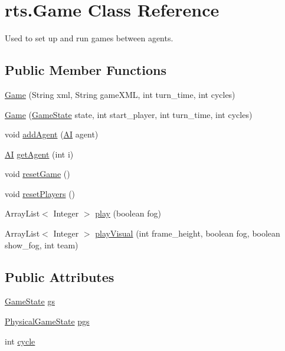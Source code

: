 \hypertarget{classrts_1_1_game}{
\section{rts.Game Class Reference}
\label{classrts_1_1_game}
}


Used to set up and run games between agents.  


\subsection*{Public Member Functions}
\begin{DoxyCompactItemize}
\item 
\hyperlink{classrts_1_1_game_a8be31ab56d3667a5de133f49d0c00873}{Game} (String xml, String gameXML, int turn\_\-time, int cycles)
\item 
\hyperlink{classrts_1_1_game_af219d17cd23b1ab5d518093eb3485b5b}{Game} (\hyperlink{classrts_1_1_game_state}{GameState} state, int start\_\-player, int turn\_\-time, int cycles)
\item 
void \hyperlink{classrts_1_1_game_aa8d2808f44534b0824965aad4d45d6b5}{addAgent} (\hyperlink{classai_1_1_a_i}{AI} agent)
\item 
\hyperlink{classai_1_1_a_i}{AI} \hyperlink{classrts_1_1_game_a73ddc70ae77467fa3e9a5abf86d692b5}{getAgent} (int i)
\item 
void \hyperlink{classrts_1_1_game_a53e09d1e869efe1c3c9faec51ca17607}{resetGame} ()
\item 
void \hyperlink{classrts_1_1_game_a787a8c636b903e86ae019db6475c7435}{resetPlayers} ()
\item 
ArrayList$<$ Integer $>$ \hyperlink{classrts_1_1_game_a2e4d31e7df06309c185d7fd6a613424a}{play} (boolean fog)
\item 
ArrayList$<$ Integer $>$ \hyperlink{classrts_1_1_game_a74d737f4b4312dc155350f624ee3a5c0}{playVisual} (int frame\_\-height, boolean fog, boolean show\_\-fog, int team)
\end{DoxyCompactItemize}
\subsection*{Public Attributes}
\begin{DoxyCompactItemize}
\item 
\hyperlink{classrts_1_1_game_state}{GameState} \hyperlink{classrts_1_1_game_a81f22c65414664ca512616faf90ecc3a}{gs}
\item 
\hyperlink{classrts_1_1_physical_game_state}{PhysicalGameState} \hyperlink{classrts_1_1_game_ae331647ec1f54d6a50a02565fb3d6c20}{pgs}
\item 
int \hyperlink{classrts_1_1_game_a0773e1a993bfe4df7709404cd3de3297}{cycle}
\end{DoxyCompactItemize}
